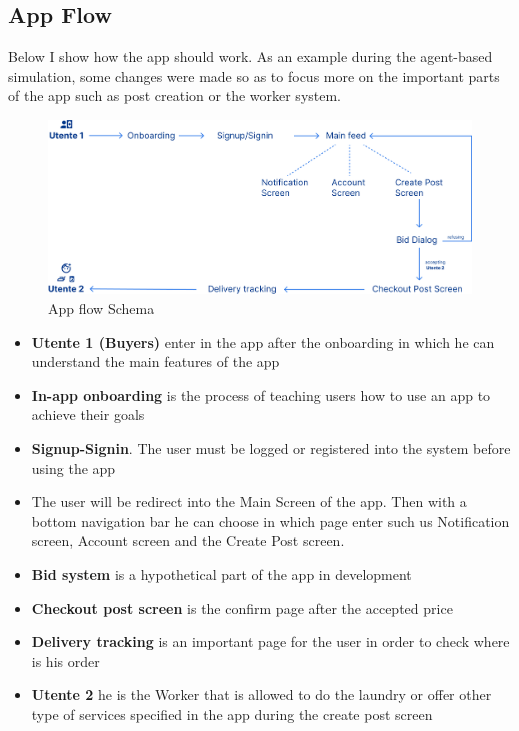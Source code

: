 \subsection{App Flow}
Below I show how the app should work. As an example during the agent-based simulation, some changes were made so as to focus more on the important parts of the app such as post creation or the worker system.
\begin{figure}[hbtp]
\caption{App flow Schema}
\centering
\includegraphics[scale=0.2]{../Images/AppFlow.png} 
\end{figure}
\begin{itemize}
\item \textbf{Utente 1 (Buyers)} enter in the app after the onboarding in which he can understand the main features of the app
\item \textbf{In-app onboarding} is the process of teaching users how to use an app to achieve their goals
\item \textbf{Signup-Signin}. The user must be logged or registered into the system before using the app 
\item The user will be redirect into the Main Screen of the app. Then with a bottom navigation bar he can choose in which page enter such us Notification screen, Account screen and the Create Post screen.
\item \textbf{Bid system} is a hypothetical part of the app in development
\item \textbf{Checkout post screen} is the confirm page after the accepted price
\item \textbf{Delivery tracking} is an important page for the user in order to check where is his order
\item \textbf{Utente 2} he is the Worker that is allowed to do the laundry or offer other type of services specified in the app during the create post screen
\end{itemize}
